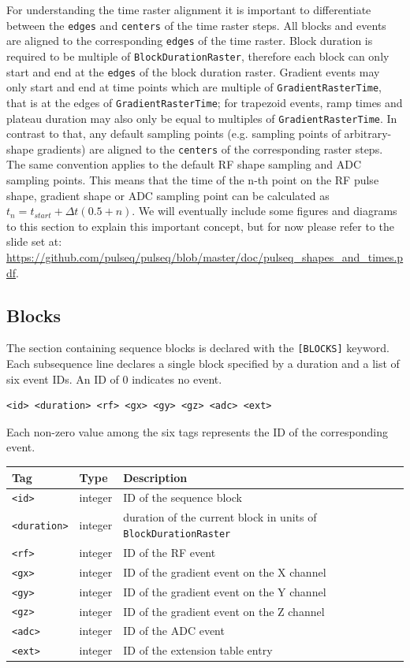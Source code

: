 \documentclass{article}
\begin{document}
For understanding the time raster alignment it is important to differentiate between the \verb.edges. and \verb.centers. of the time raster steps. All blocks and events are aligned to the corresponding \verb.edges. of the time raster. Block duration is required to be multiple of \verb.BlockDurationRaster., therefore each block can only start and end at the \verb.edges. of the block duration raster. Gradient events may only start and end at time points which are multiple of \verb.GradientRasterTime., that is at the edges of \verb.GradientRasterTime.; for trapezoid events, ramp times and plateau duration may also only be equal to multiples of \verb.GradientRasterTime.. In contrast to that, any default sampling points (e.g. sampling points of arbitrary-shape gradients) are aligned to the \verb.centers. of the corresponding raster steps. The same convention applies to the default RF shape sampling and ADC sampling points. This means that the time of the n-th point on the RF pulse shape, gradient shape or ADC sampling point can be calculated as $t_n=t_{start} + \Delta t(0.5+n)$. We will eventually include some figures and diagrams to this section to explain this important concept, but for now please refer to the slide set at: \href{https://github.com/pulseq/pulseq/blob/master/doc/pulseq_shapes_and_times.pdf}{https://github.com/pulseq/pulseq/blob/master/doc/pulseq\_shapes\_and\_times.pdf}.


\subsection{Blocks}

The section containing sequence blocks is declared with the \verb.[BLOCKS]. keyword. Each subsequence line declares a single block specified by a duration and a list of six event IDs. An ID of 0 indicates no event.
\begin{lstlisting}
<id> <duration> <rf> <gx> <gy> <gz> <adc> <ext>
\end{lstlisting}

Each non-zero value among the six tags represents the ID of the corresponding event.

\begin{tabularx}{\textwidth}{llX}
\toprule
Tag & Type & Description\\
\midrule
\verb.<id>. & integer & ID of the sequence block \\
\verb.<duration>. & integer & duration of the current block in units of \verb.BlockDurationRaster. \\
\verb.<rf>. & integer & ID of the RF event \\
\verb.<gx>. & integer & ID of the gradient event on the X channel \\
\verb.<gy>. & integer & ID of the gradient event on the Y channel \\
\verb.<gz>. & integer & ID of the gradient event on the Z channel \\
\verb.<adc>. & integer & ID of the ADC event \\
\verb.<ext>. & integer & ID of the extension table entry \\
\bottomrule
\end{tabularx}
\end{document}
